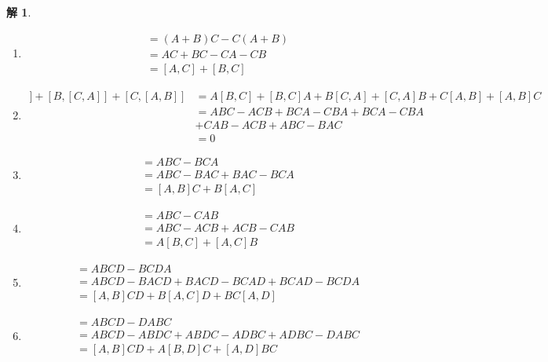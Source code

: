 \documentclass{article}
\newtheorem{solution}{解}
\begin{document}
\begin{solution}
    \begin{enumerate}
        \item 
        \begin{align*}
            [A+B,C]&=(A+B)C-C(A+B)\\
            &=AC+BC-CA-CB\\
            &=[A,C]+[B,C]
            \end{align*}
        \item 
        \begin{align*}
            [A,[B,C]]+[B,[C,A]]+[C,[A,B]]&=A[B,C]+[B,C]A+B[C,A]+[C,A]B+C[A,B]+[A,B]C\\
            &=ABC-ACB+BCA-CBA+BCA-CBA\\
            &+CAB-ACB+ABC-BAC\\
            &=0
        \end{align*}
        \item 
        \begin{align*}
            [A,BC]&=ABC-BCA\\
            &=ABC-BAC+BAC-BCA\\
            &=[A,B]C+B[A,C]    
        \end{align*}
        \item 
        \begin{align*}
            [AB,C]&=ABC-CAB\\
            &=ABC-ACB+ACB-CAB\\
            &=A[B,C]+[A,C]B    
        \end{align*}
        \item 
        \begin{align*}
            [A,BCD]&=ABCD-BCDA\\
            &=ABCD-BACD+BACD-BCAD+BCAD-BCDA\\
            &=[A,B]CD+B[A,C]D+BC[A,D]    
        \end{align*}
        \item 
        \begin{align*}
            [ABC,D]&=ABCD-DABC\\
            &=ABCD-ABDC+ABDC-ADBC+ADBC-DABC\\
            &=[A,B]CD+A[B,D]C+[A,D]BC    
        \end{align*}
    \end{enumerate}
\end{solution}
\end{document}
